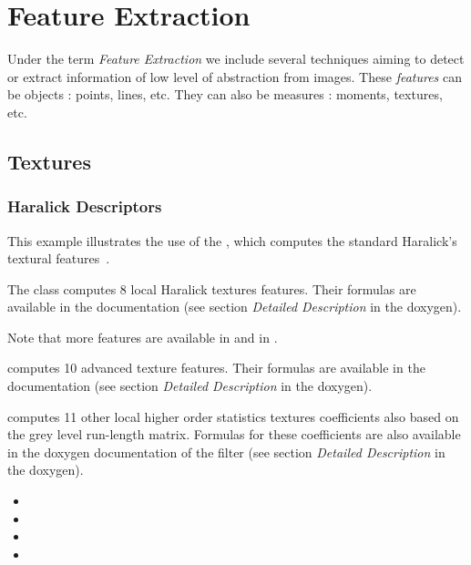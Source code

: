\chapter{Feature Extraction}


Under the term {\em Feature Extraction} we include several techniques
aiming to detect or extract information of low level of abstraction
from images. These {\em features} can be objects : points, lines,
etc. They can also be measures : moments, textures, etc.

\section{Textures}
\subsection{Haralick Descriptors}

This example illustrates the use of the ,
which computes the standard Haralick's textural features~\cite{Haralick1973}.

The  class computes 8 local Haralick
textures features. Their formulas are available in the
 documentation (see section
\textit{Detailed Description} in the doxygen).

Note that more features are available in
 and in
.

 computes 10 advanced
texture features. Their formulas are available in the
 documentation (see section
\textit{Detailed Description} in the doxygen).

 computes 11
other local higher order statistics textures coefficients also based on the grey
level run-length matrix. Formulas for these coefficients are also
available in the doxygen documentation of the filter (see section
\textit{Detailed Description} in the doxygen).

\relatedClasses
\begin{itemize}
\item {}
\item {}
\item {}
\item {}
\end{itemize}

